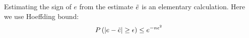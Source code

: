 \documentclass{article}
\begin{document}
Estimating the sign of $e$ from the estimate $\tilde{e}$ is an
elementary calculation. Here we use Hoeffding bound:
\begin{equation}
  P\left( |e -\tilde{e}| \geq \epsilon \right)
  \leq e^{-n \epsilon^2}
\end{equation}
\fi

\end{document}
